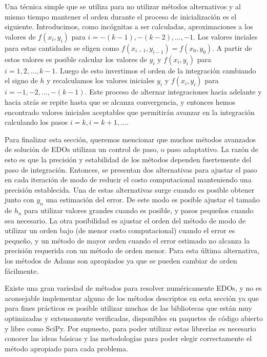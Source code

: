  Una técnica simple que se utiliza para no utilizar métodos alternativos y al mismo tiempo mantener el orden durante el proceso de inicialización es el siguiente. Introducimos, como incógnitas a ser calculadas, aproximaciones a los valores de $f(x_i, y_i)$ para $i = -(k-1), -(k-2), \ldots, -1$. Los valores inciales para estas cantidades se eligen como $f(x_{i-1}, y_{i-1}) = f(x_0, y_0)$. A partir de estos valores es posible calcular los valores de $y_i$ y $f(x_i, y_i)$ para $i = 1, 2, \ldots, k-1$. Luego de esto invertimos el orden de la integración cambiando el signo de $h$ y recalculamos los valores iniciales $y_i$ y $f(x_i, y_i)$ para $i = -1, -2, \ldots, -(k-1)$. Este proceso de alternar integraciones hacia adelante y hacia atrás se repite hasta que se alcanza convergencia, y entonces hemos encontrado valores iniciales aceptables que permitirán avanzar en la integración calculando los pasos $i = k, i = k+1, \ldots$.
 
 Para finalizar esta sección, queremos mencionar que muchos métodos avanzados de solución de EDOs utilizan un control de paso, o paso adaptativo. La razón de esto es que la precisión y estabilidad de los métodos dependen fuertemente del paso de integración. Entonces, se presentan dos alternativas para ajustar el paso en cada iteración de modo de reducir el costo computacional manteniendo una precisión establecida. Una de estas alternativas surge cuando es posible obtener junto con $y_n$ una estimación del error. De este modo es posible ajustar el tamaño de $h_n$ para utilizar valores grandes cuando es posible, y pasos pequeños cuando sea necesario. La otra posibilidad es ajustar el orden del método de modo de utilizar un orden bajo (de menor costo computacional) cuando el error es pequeño, y un método de mayor orden cuando el error estimado no alcanza la precisión requerida con un método de orden menor. Para esta última alternativa, los métodos de Adams son apropiados ya que se pueden cambiar de orden fácilmente.

 Existe una gran variedad de métodos para resolver numéricamente EDOs, y no es aconsejable implementar alguno de los métodos descriptos en esta sección ya que para fines prácticos es posible utilizar muchas de las bibliotecas que están muy optimizadas y extensamente verificadas, disponibles en paquetes de código abierto y libre como SciPy. Por supuesto, para poder utilizar estas librerías es necesario conocer las ideas básicas y las metodologías para poder elegir correctamente el método apropiado para cada problema.
 
